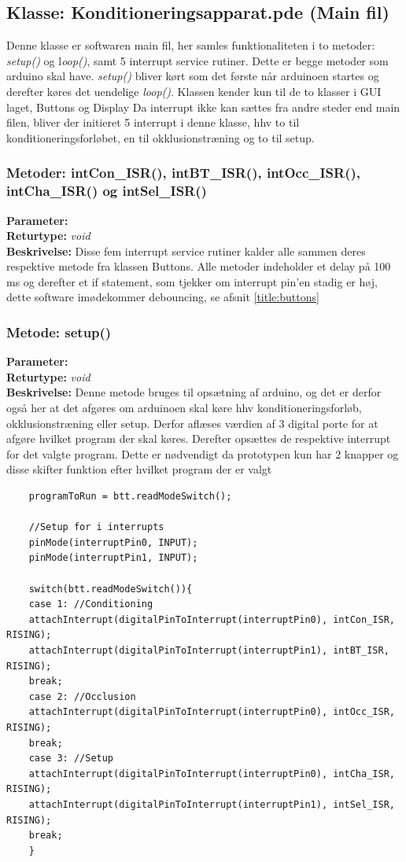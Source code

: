 \subsection{Klasse: Konditioneringsapparat.pde (Main fil)}
Denne klasse er softwaren main fil, her samles funktionaliteten i to metoder: \textit{setup()} og l\textit{oop()}, samt 5 interrupt service rutiner. Dette er begge metoder som arduino skal have. \textit{setup()} bliver kørt som det første når arduinoen startes og derefter køres det uendelige \textit{loop()}. Klassen kender kun til de to klasser i GUI laget, Buttons og Display
Da interrupt ikke kan sættes fra andre steder end main filen, bliver der initieret 5 interrupt i denne klasse, hhv to til konditioneringsforløbet, en til okklusionstræning og to til setup.

\subsubsection{Metoder: intCon\_ISR(), intBT\_ISR(), intOcc\_ISR(), intCha\_ISR() og intSel\_ISR()}
\textbf{Parameter: } 
\\ \textbf{Returtype: } \textit{void}
\\ \textbf{Beskrivelse: } Disse fem interrupt service rutiner kalder alle sammen deres respektive metode fra klassen Buttons. Alle metoder indeholder et delay på 100 ms og derefter et if statement, som tjekker om interrupt pin’en stadig er høj, dette software imødekommer debouncing, se afsnit \ref{title:buttons}


\subsubsection{Metode: setup()}
\textbf{Parameter: } 
\\ \textbf{Returtype: } \textit{void}
\\ \textbf{Beskrivelse: } Denne metode bruges til opsætning af arduino, og det er derfor også her at det afgøres om arduinoen skal køre hhv konditioneringsforløb, okklusionstræning eller setup. Derfor aflæses værdien af 3 digital porte for at afgøre hvilket program der skal køres. Derefter opsættes de respektive interrupt for det valgte program. Dette er nødvendigt da prototypen kun har 2 knapper og disse skifter funktion efter hvilket program der er valgt
\begin{lstlisting}
	programToRun = btt.readModeSwitch();
	
	//Setup for i interrupts
	pinMode(interruptPin0, INPUT);
	pinMode(interruptPin1, INPUT);
	
	switch(btt.readModeSwitch()){
	case 1: //Conditioning
	attachInterrupt(digitalPinToInterrupt(interruptPin0), intCon_ISR, RISING);
	attachInterrupt(digitalPinToInterrupt(interruptPin1), intBT_ISR, RISING);
	break;
	case 2: //Occlusion
	attachInterrupt(digitalPinToInterrupt(interruptPin0), intOcc_ISR, RISING);
	break;
	case 3: //Setup
	attachInterrupt(digitalPinToInterrupt(interruptPin0), intCha_ISR, RISING);
	attachInterrupt(digitalPinToInterrupt(interruptPin1), intSel_ISR, RISING);
	break;
	}
\end{lstlisting}

